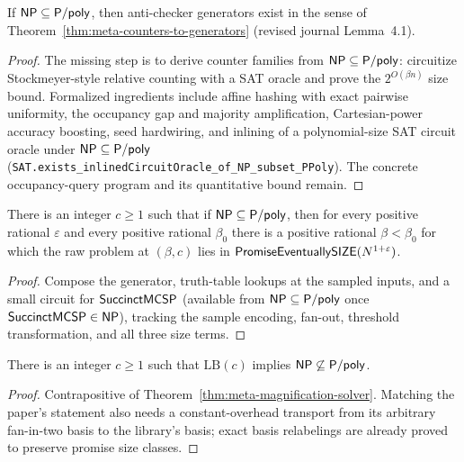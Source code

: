\begin{theorem}
  \label{thm:meta-antichecker-lemma}
  If $\mathsf{NP} \subseteq \mathsf{P/poly}$, then anti-checker generators exist in
  the sense of Theorem~\ref{thm:meta-counters-to-generators} (revised journal
  Lemma~4.1).
\end{theorem}
\begin{proof}
  The missing step is to derive counter families from $\mathsf{NP} \subseteq
  \mathsf{P/poly}$: circuitize Stockmeyer-style relative counting with a SAT oracle
  and prove the $2^{O(\beta n)}$ size bound. Formalized ingredients include
  affine hashing with exact pairwise uniformity, the occupancy gap and
  majority amplification, Cartesian-power accuracy boosting, seed hardwiring,
  and inlining of a polynomial-size SAT circuit oracle under $\mathsf{NP} \subseteq
  \mathsf{P/poly}$ (\texttt{SAT.exists\_inlinedCircuitOracle\_of\_NP\_subset\_PPoly}).
  The concrete occupancy-query program and its quantitative bound remain.
\end{proof}

\begin{theorem}
  \label{thm:meta-magnification-solver}
  There is an integer $c \ge 1$ such that if $\mathsf{NP} \subseteq \mathsf{P/poly}$,
  then for every positive rational $\varepsilon$ and every positive rational
  $\beta_0$ there is a positive rational $\beta < \beta_0$ for which the raw
  problem at $(\beta, c)$ lies in
  $\mathsf{PromiseEventuallySIZE}(N^{1+\varepsilon})$.
\end{theorem}
\begin{proof}
  Compose the generator, truth-table lookups at the sampled inputs, and a small
  circuit for $\mathsf{SuccinctMCSP}$ (available from $\mathsf{NP} \subseteq
  \mathsf{P/poly}$ once $\mathsf{SuccinctMCSP} \in \mathsf{NP}$), tracking the sample
  encoding, fan-out, threshold transformation, and all three size terms.
\end{proof}

\begin{theorem}
  \label{thm:meta-magnification}
  There is an integer $c \ge 1$ such that $\mathrm{LB}(c)$ implies
  $\mathsf{NP} \not\subseteq \mathsf{P/poly}$.
\end{theorem}
\begin{proof}
  Contrapositive of Theorem~\ref{thm:meta-magnification-solver}. Matching the
  paper's statement also needs a constant-overhead transport from its
  arbitrary fan-in-two basis to the library's basis; exact basis relabelings
  are already proved to preserve promise size classes.
\end{proof}

